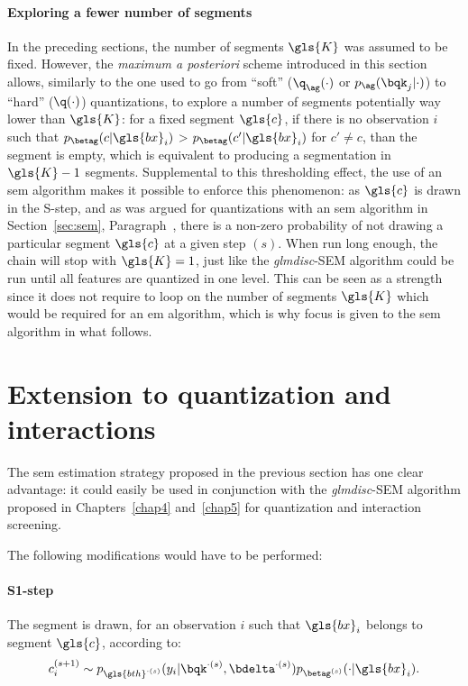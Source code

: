 \paragraph{Exploring a fewer number of segments}
In the preceding sections, the number of segments $\gls{K}$ was assumed to be fixed. However, the \textit{maximum a posteriori} scheme introduced in this section allows, similarly to the one used to go from ``soft'' ($\q_{\ag}(\cdot)$ or $p_{\ag}(\bqk_j | \cdot)$) to ``hard'' ($\q(\cdot)$) quantizations, to explore a number of segments potentially way lower than $\gls{K}$: for a fixed segment $\gls{c}$, if there is no observation $i$ such that $p_{\betag}(c | \gls{bx}_i)$ > $p_{\betag}(c' | \gls{bx}_i)$ for $c' \neq c$, than the segment is empty, which is equivalent to producing a segmentation in $\gls{K}-1$ segments. Supplemental to this thresholding effect, the use of an \gls{sem} algorithm makes it possible to enforce this phenomenon: as $\gls{c}$ is drawn in the S-step, and as was argued for quantizations with an \gls{sem} algorithm in Section~\ref{sec:sem}, Paragraph~, there is a non-zero probability of not drawing a particular segment $\gls{c}$ at a given step $(s)$. When run long enough, the chain will stop with $\gls{K} = 1$, just like the \textit{glmdisc}-SEM algorithm could be run until all features are quantized in one level. This can be seen as a strength since it does not require to loop on the number of segments $\gls{K}$ which would be required for an \gls{em} algorithm, which is why focus is given to the \gls{sem} algorithm in what follows.


\section{Extension to quantization and interactions} \label{sec:adding_quant}

The \gls{sem} estimation strategy proposed in the previous section has one clear advantage: it could easily be used in conjunction with the \textit{glmdisc}-SEM algorithm proposed in Chapters~\ref{chap4} and~\ref{chap5} for quantization and interaction screening.

The following modifications would have to be performed:
\paragraph{S1-step} The segment is drawn, for an observation $i$ such that $\gls{bx}_i$ belongs to segment $\gls{c}$, according to:
\[ c_i^{(s+1)} \sim p_{\gls{bth}^{\cdot(s)}}(y_i | \bqk^{\cdot(s)},\bdelta^{\cdot(s)}) p_{\betag^{(s)}}(\cdot | \gls{bx}_i). \]

